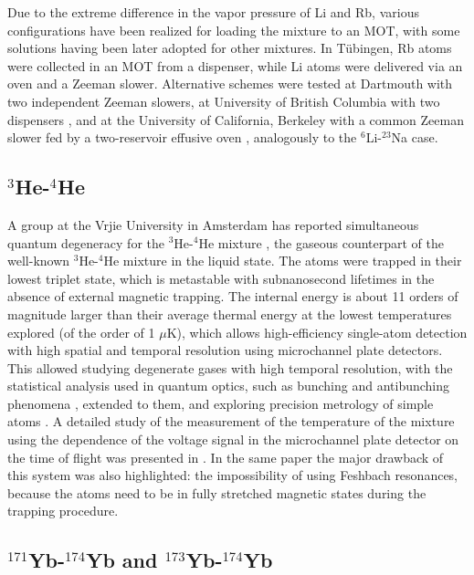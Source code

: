 \documentclass[pra,letterpaper,twocolumn,showpacs,superscriptaddress]{revtex4}
\begin{document}
Due to the extreme difference in the vapor pressure of Li and Rb, various configurations have been realized for loading the 
mixture to an MOT, with some solutions having been later adopted for other mixtures. 
In T\"ubingen, Rb atoms were collected in an MOT from a dispenser, while Li atoms were delivered via an oven and a Zeeman slower. 
Alternative schemes were tested at Dartmouth \cite{Brown2007} with two independent Zeeman slowers, at University of British Columbia 
with two dispensers \cite{Ladouceur2009}, and at the University of California, Berkeley with a common Zeeman slower fed by a two-reservoir 
effusive oven \cite{Marti2010}, analogously to the ${}^6$Li-${}^{23}$Na case.

\subsection{${}^{3}$He-${}^{4}$He}

A group at the Vrjie University  in Amsterdam has reported simultaneous quantum degeneracy for the ${}^3$He-${}^4$He mixture \cite{McNamara2006}, the 
gaseous counterpart of the well-known ${}^3$He-${}^4$He mixture in the liquid state. The atoms were trapped in their lowest triplet state, which is metastable 
with subnanosecond lifetimes in the absence of external magnetic trapping. The internal energy is about 11 orders of magnitude larger than their 
average thermal energy at the lowest temperatures explored (of the order of 1 $\mu$K), which allows high-efficiency single-atom detection with high spatial 
and temporal resolution using microchannel plate detectors. This allowed studying degenerate gases with high temporal 
resolution, with the statistical analysis used in quantum optics, such as bunching and antibunching phenomena \cite{Jeltes2007}, extended to them, and 
exploring precision metrology of simple atoms \cite{Vassen2012}. A detailed study of the measurement of the temperature of the mixture using the 
dependence of the voltage signal in the microchannel plate detector on the time of flight was presented in \cite{McNamara2006}. 
In the same paper the major drawback of this system was also highlighted: the impossibility of using Feshbach resonances, because the atoms need to 
be in fully stretched magnetic states during the trapping procedure.

\subsection{${}^{171}$Yb-${}^{174}$Yb and ${}^{173}$Yb-${}^{174}$Yb}
\end{document}
